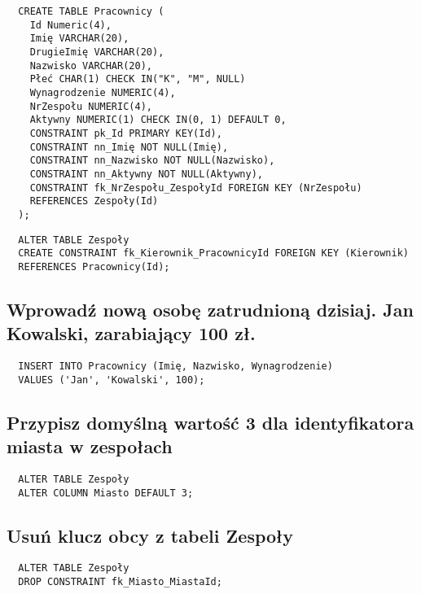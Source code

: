 \documentclass{article}
\begin{document}
\begin{verbatim}
  CREATE TABLE Pracownicy (
    Id Numeric(4),
    Imię VARCHAR(20),
    DrugieImię VARCHAR(20),
    Nazwisko VARCHAR(20),
    Płeć CHAR(1) CHECK IN("K", "M", NULL)
    Wynagrodzenie NUMERIC(4),
    NrZespołu NUMERIC(4),
    Aktywny NUMERIC(1) CHECK IN(0, 1) DEFAULT 0,
    CONSTRAINT pk_Id PRIMARY KEY(Id),
    CONSTRAINT nn_Imię NOT NULL(Imię),
    CONSTRAINT nn_Nazwisko NOT NULL(Nazwisko),
    CONSTRAINT nn_Aktywny NOT NULL(Aktywny),
    CONSTRAINT fk_NrZespołu_ZespołyId FOREIGN KEY (NrZespołu)
    REFERENCES Zespoły(Id)
  ); 
\end{verbatim}
\pagebreak
\begin{verbatim}
  ALTER TABLE Zespoły
  CREATE CONSTRAINT fk_Kierownik_PracownicyId FOREIGN KEY (Kierownik)
  REFERENCES Pracownicy(Id);
\end{verbatim}
\subsection{Wprowadź nową osobę zatrudnioną dzisiaj. Jan Kowalski, zarabiający 100 zł.}
\begin{verbatim}
  INSERT INTO Pracownicy (Imię, Nazwisko, Wynagrodzenie)
  VALUES ('Jan', 'Kowalski', 100);
\end{verbatim}
\subsection{Przypisz domyślną wartość 3 dla identyfikatora miasta w zespołach}
\begin{verbatim}
  ALTER TABLE Zespoły
  ALTER COLUMN Miasto DEFAULT 3;
\end{verbatim}
\subsection{Usuń klucz obcy z tabeli Zespoły}
\begin{verbatim}
  ALTER TABLE Zespoły
  DROP CONSTRAINT fk_Miasto_MiastaId;
\end{verbatim}
\end{document}
